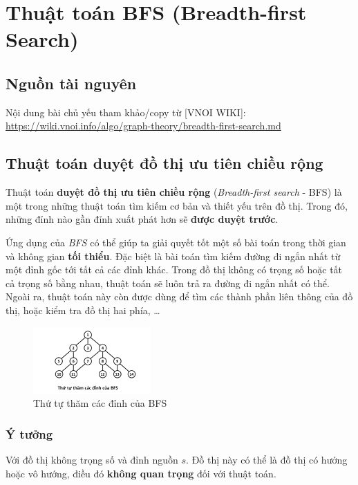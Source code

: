 \chapter{Thuật toán BFS (Breadth-first Search)}

\minitoc

\section{Nguồn tài nguyên}

Nội dung bài chủ yếu tham khảo/copy từ [VNOI WIKI]: \url{https://wiki.vnoi.info/algo/graph-theory/breadth-first-search.md}


\section{Thuật toán duyệt đồ thị ưu tiên chiều rộng}

Thuật toán \textbf{duyệt đồ thị ưu tiên chiều rộng} (\textit{Breadth-first search} - BFS) là một trong những thuật toán tìm kiếm cơ bản và thiết yếu trên đồ thị. Trong đó, những đỉnh nào gần đỉnh xuất phát hơn sẽ \textbf{được duyệt trước}.

Ứng dụng của \textit{BFS} có thể giúp ta giải quyết tốt một số bài toán trong thời gian và không gian \textbf{tối thiểu}. Đặc biệt là bài toán tìm kiếm đường đi ngắn nhất từ một đỉnh gốc tới tất cả các đỉnh khác. Trong đồ thị không có trọng số hoặc tất cả trọng số bằng nhau, thuật toán sẽ luôn trả ra đường đi ngắn nhất có thể. Ngoài ra, thuật toán này còn được dùng để tìm các thành phần liên thông của đồ thị, hoặc kiểm tra đồ thị hai phía, \ldots

\begin{figure}[h]
    \centering
    \includegraphics[width=0.4\textwidth]{resource/img/b6/breadth-first-search_img1.png}
    \caption{Thứ tự thăm các đỉnh của BFS}
\end{figure}

\subsection{Ý tưởng}

Với đồ thị không trọng số và đỉnh nguồn $s$. Đồ thị này có thể là đồ thị có hướng hoặc vô hướng, điều đó \textbf{không quan trọng} đối với thuật toán. 

